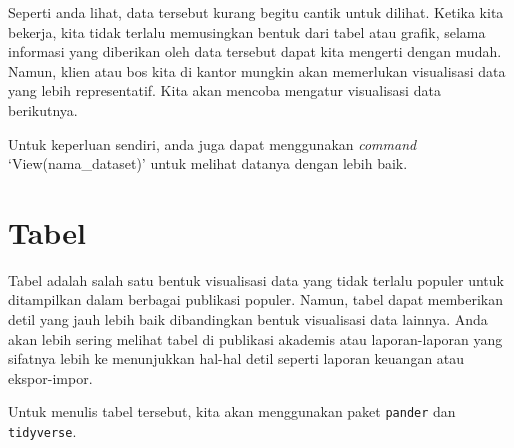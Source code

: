 \documentclass[
]{book}
\newenvironment{Shaded}{\begin{snugshade}}{\end{snugshade}}
\newcommand{\CommentTok}[1]{\textcolor[rgb]{0.56,0.35,0.01}{\textit{#1}}}
\newcommand{\KeywordTok}[1]{\textcolor[rgb]{0.13,0.29,0.53}{\textbf{#1}}}
\newcommand{\NormalTok}[1]{#1}
\newcommand{\OperatorTok}[1]{\textcolor[rgb]{0.81,0.36,0.00}{\textbf{#1}}}
\newcommand{\StringTok}[1]{\textcolor[rgb]{0.31,0.60,0.02}{#1}}
\begin{document}
Seperti anda lihat, data tersebut kurang begitu cantik untuk dilihat. Ketika kita bekerja, kita tidak terlalu memusingkan bentuk dari tabel atau grafik, selama informasi yang diberikan oleh data tersebut dapat kita mengerti dengan mudah. Namun, klien atau bos kita di kantor mungkin akan memerlukan visualisasi data yang lebih representatif. Kita akan mencoba mengatur visualisasi data berikutnya.

Untuk keperluan sendiri, anda juga dapat menggunakan \emph{command} `View(nama\_dataset)' untuk melihat datanya dengan lebih baik.

\hypertarget{tabel}{%
\section{Tabel}\label{tabel}}

Tabel adalah salah satu bentuk visualisasi data yang tidak terlalu populer untuk ditampilkan dalam berbagai publikasi populer. Namun, tabel dapat memberikan detil yang jauh lebih baik dibandingkan bentuk visualisasi data lainnya. Anda akan lebih sering melihat tabel di publikasi akademis atau laporan-laporan yang sifatnya lebih ke menunjukkan hal-hal detil seperti laporan keuangan atau ekspor-impor.

Untuk menulis tabel tersebut, kita akan menggunakan paket \texttt{pander} dan \texttt{tidyverse}.

\begin{Shaded}
\end{Shaded}
\end{document}
